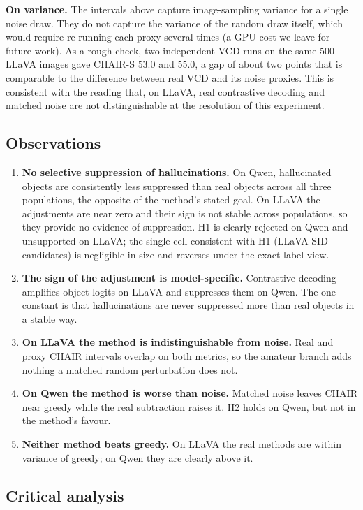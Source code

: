 \textbf{On variance.} The intervals above capture image-sampling variance for a
single noise draw. They do not capture the variance of the random draw itself,
which would require re-running each proxy several times (a GPU cost we leave for
future work). As a rough check, two independent VCD runs on the same 500 LLaVA
images gave CHAIR-S $53.0$ and $55.0$, a gap of about two points that is
comparable to the difference between real VCD and its noise proxies. This is
consistent with the reading that, on LLaVA, real contrastive decoding and matched
noise are not distinguishable at the resolution of this experiment.

\subsection{Observations}
\label{subsec:dproxy-obs}

\begin{enumerate}
  \item \textbf{No selective suppression of hallucinations.} On Qwen,
  hallucinated objects are consistently less suppressed than real objects across
  all three populations, the opposite of the method's stated goal. On LLaVA the
  adjustments are near zero and their sign is not stable across populations, so
  they provide no evidence of suppression. H1 is clearly rejected on Qwen and
  unsupported on LLaVA; the single cell consistent with H1 (LLaVA-SID candidates)
  is negligible in size and reverses under the exact-label view.
  \item \textbf{The sign of the adjustment is model-specific.} Contrastive
  decoding amplifies object logits on LLaVA and suppresses them on Qwen. The one
  constant is that hallucinations are never suppressed more than real objects in a
  stable way.
  \item \textbf{On LLaVA the method is indistinguishable from noise.} Real and
  proxy CHAIR intervals overlap on both metrics, so the amateur branch adds
  nothing a matched random perturbation does not.
  \item \textbf{On Qwen the method is worse than noise.} Matched noise leaves
  CHAIR near greedy while the real subtraction raises it. H2 holds on Qwen, but
  not in the method's favour.
  \item \textbf{Neither method beats greedy.} On LLaVA the real methods are within
  variance of greedy; on Qwen they are clearly above it.
\end{enumerate}

\subsection{Critical analysis}
\label{subsec:dproxy-critique}

